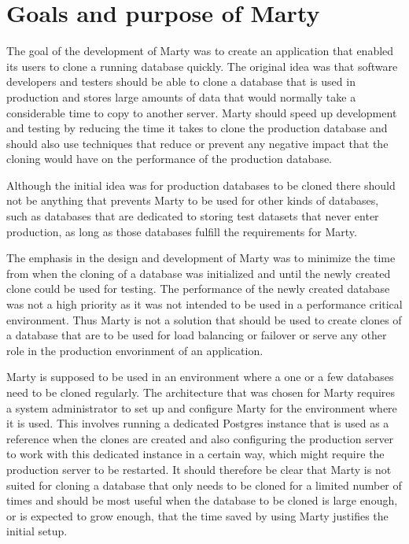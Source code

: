 \chapter{Goals and purpose of Marty}
The goal of the development of Marty was to create an application that enabled its users to clone a running database quickly.
The original idea was that software developers and testers should be able to clone a database that is used in production and stores large amounts of data that would normally take a considerable time to copy to another server.
Marty should speed up development and testing by reducing the time it takes to clone the production database and should also use techniques that reduce or prevent any negative impact that the cloning would have on the performance of the production database. 

Although the initial idea was for production databases to be cloned there should not be anything that prevents Marty to be used for other kinds of databases, such as databases that are dedicated to storing test datasets that never enter production, as long as those databases fulfill the requirements for Marty.

The emphasis in the design and development of Marty was to minimize the time from when the cloning of a database was initialized and until the newly created clone could be used for testing.
The performance of the newly created database was not a high priority as it was not intended to be used in a performance critical environment.
Thus Marty is not a solution that should be used to create clones of a database that are to be used for load balancing or failover or serve any other role in the production envorinment of an application.

Marty is supposed to be used in an environment where a one or a few databases need to be cloned regularly.
The architecture that was chosen for Marty requires a system administrator to set up and configure Marty for the environment where it is used.
This involves running a dedicated Postgres instance that is used as a reference when the clones are created and also configuring the production server to work with this dedicated instance in a certain way, which might require the production server to be restarted.
It should therefore be clear that Marty is not suited for cloning a database that only needs to be cloned for a limited number of times and should be most useful when the database to be cloned is large enough, or is expected to grow enough, that the time saved by using Marty justifies the initial setup.